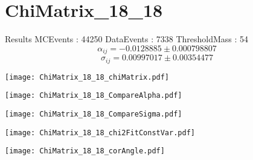 \documentclass[a4paper,12pt]{article}
\begin{document}
\section{ChiMatrix\_18\_18}
\begin{minipage}{0.49\linewidth} Results \newline
MCEvents : 44250\newline
DataEvents : 7338 \newline
ThresholdMass : 54\\
$$\alpha_{ij} = -0.0128885\pm 0.000798807$$
$$\sigma_{ij} = 0.00997017\pm 0.00354477$$
\end{minipage}\hfill
\begin{minipage}{0.49\linewidth} 
\texttt{[image: ChiMatrix\_18\_18\_chiMatrix.pdf]}\\
\end{minipage}
\hfill
\begin{minipage}{0.49\linewidth} 
\texttt{[image: ChiMatrix\_18\_18\_CompareAlpha.pdf]}\\
\end{minipage}
\hfill
\begin{minipage}{0.49\linewidth} 
\texttt{[image: ChiMatrix\_18\_18\_CompareSigma.pdf]}\\
\end{minipage}
\begin{minipage}{0.49\linewidth} 
\texttt{[image: ChiMatrix\_18\_18\_chi2FitConstVar.pdf]}\\
\end{minipage}
\hfill
\begin{minipage}{0.49\linewidth} 
\texttt{[image: ChiMatrix\_18\_18\_corAngle.pdf]}\\
\end{minipage}
\end{document}
